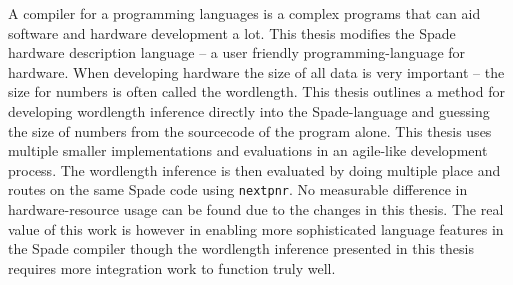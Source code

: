 A compiler for a programming languages is a complex programs that can aid software and hardware development a lot. This thesis modifies the Spade hardware description language -- a user friendly programming-language for hardware. When developing hardware the size of all data is very important -- the size for numbers is often called the wordlength. This thesis outlines a method for developing wordlength inference directly into the Spade-language and guessing the size of numbers from the sourcecode of the program alone. This thesis uses multiple smaller implementations and evaluations in an agile-like development process. The wordlength inference is then evaluated by doing multiple place and routes on the same Spade code using \verb|nextpnr|. No measurable difference in hardware-resource usage can be found due to the changes in this thesis. The real value of this work is however in enabling more sophisticated language features in the Spade compiler though the wordlength inference presented in this thesis requires more integration work to function truly well.
